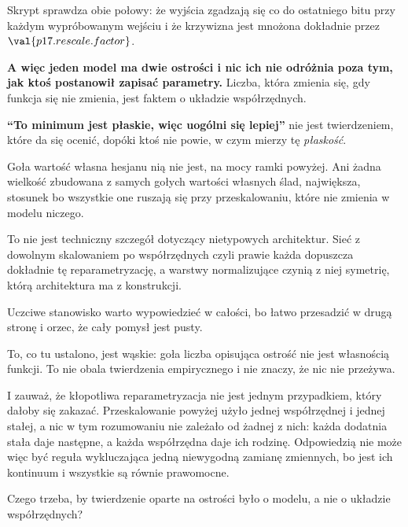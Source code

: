 \begin{fr}
Skrypt sprawdza obie połowy: że wyjścia zgadzają się co do ostatniego bitu przy
każdym wypróbowanym wejściu i że krzywizna jest mnożona dokładnie przez
$\val{p17.rescale.factor}$.

\textbf{A więc jeden model ma dwie ostrości i nic ich nie odróżnia poza tym,
jak ktoś postanowił zapisać parametry.} Liczba, która zmienia się, gdy funkcja
się nie zmienia, jest faktem o układzie współrzędnych.

\end{fr}

\begin{fr}
\begin{trapbox}
\textbf{\enquote{To minimum jest płaskie, więc uogólni się lepiej}} nie jest
twierdzeniem, które da się ocenić, dopóki ktoś nie powie, w czym mierzy tę
\emph{płaskość}.

Goła wartość własna hesjanu nią nie jest, na mocy ramki powyżej. Ani żadna
wielkość zbudowana z samych gołych wartości własnych \dash{} ślad, największa,
stosunek \dash{} bo wszystkie one ruszają się przy przeskalowaniu, które nie
zmienia w modelu niczego.

To nie jest techniczny szczegół dotyczący nietypowych architektur. Sieć z
dowolnym skalowaniem po współrzędnych \dash{} czyli prawie każda \dash{}
dopuszcza dokładnie tę reparametryzację, a warstwy normalizujące czynią z niej
symetrię, którą architektura ma z konstrukcji.
\end{trapbox}
\end{fr}

\begin{fr}
Uczciwe stanowisko warto wypowiedzieć w całości, bo łatwo przesadzić w drugą
stronę i orzec, że cały pomysł jest pusty.

To, co tu ustalono, jest wąskie: goła liczba opisująca ostrość nie jest
własnością funkcji. To nie obala twierdzenia empirycznego i nie znaczy, że nic
nie przeżywa.

I zauważ, że kłopotliwa reparametryzacja nie jest jednym przypadkiem, który
dałoby się zakazać. Przeskalowanie powyżej użyło jednej współrzędnej i jednej
stałej, a nic w tym rozumowaniu nie zależało od żadnej z nich: każda dodatnia
stała daje następne, a każda współrzędna daje ich rodzinę. Odpowiedzią nie może
więc być reguła wykluczająca jedną niewygodną zamianę zmiennych, bo jest ich
kontinuum i wszystkie są równie prawomocne.

Czego trzeba, by twierdzenie oparte na ostrości było o modelu, a nie o układzie
współrzędnych?
\dotline
\nextframe
\end{fr}

